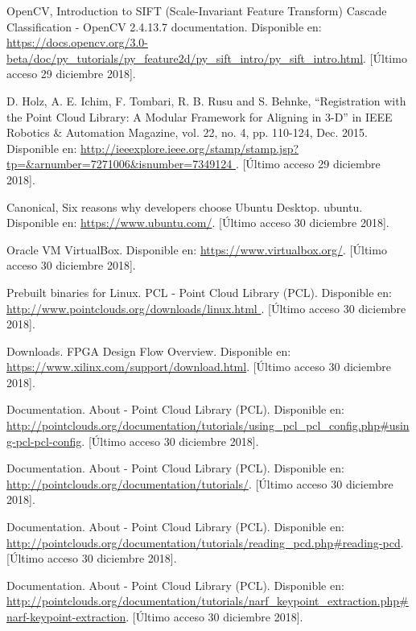 \begin{thebibliography}{99}
 OpenCV,  Introduction to SIFT (Scale-Invariant Feature Transform) Cascade Classification - OpenCV 2.4.13.7 documentation. Disponible en: \url{https://docs.opencv.org/3.0-beta/doc/py_tutorials/py_feature2d/py_sift_intro/py_sift_intro.html}. [Último acceso 29 diciembre 2018].


 D. Holz, A. E. Ichim, F. Tombari, R. B. Rusu and S. Behnke, ``Registration with the Point Cloud Library: A Modular Framework for Aligning in 3-D'' in IEEE Robotics \& Automation Magazine, vol. 22, no. 4, pp. 110-124, Dec. 2015. Disponible en: \url{http://ieeexplore.ieee.org/stamp/stamp.jsp?tp=&arnumber=7271006&isnumber=7349124
}. [Último acceso 29 diciembre 2018].


 Canonical, Six reasons why developers choose Ubuntu Desktop. ubuntu. Disponible en: \url{https://www.ubuntu.com/}. [Último acceso 30 diciembre 2018].

 Oracle VM VirtualBox. Disponible en: \url{https://www.virtualbox.org/}. [Último acceso 30 diciembre 2018].

 Prebuilt binaries for Linux. PCL - Point Cloud Library (PCL). Disponible en: \url{http://www.pointclouds.org/downloads/linux.html }. [Último acceso 30 diciembre 2018].

 Downloads. FPGA Design Flow Overview. Disponible en: \url{https://www.xilinx.com/support/download.html}. [Último acceso 30 diciembre 2018].





 Documentation. About - Point Cloud Library (PCL). Disponible en: \url{http://pointclouds.org/documentation/tutorials/using_pcl_pcl_config.php#using-pcl-pcl-config}. [Último acceso 30 diciembre 2018].


 Documentation. About - Point Cloud Library (PCL). Disponible en: \url{http://pointclouds.org/documentation/tutorials/}. [Último acceso 30 diciembre 2018].

 Documentation. About - Point Cloud Library (PCL). Disponible en: \url{http://pointclouds.org/documentation/tutorials/reading_pcd.php#reading-pcd}. [Último acceso 30 diciembre 2018].

 Documentation. About - Point Cloud Library (PCL). Disponible en: \url{http://pointclouds.org/documentation/tutorials/narf_keypoint_extraction.php#narf-keypoint-extraction}. [Último acceso 30 diciembre 2018].


\end{thebibliography}
